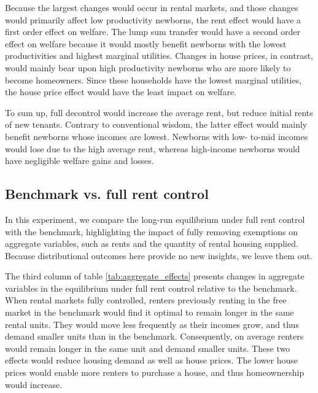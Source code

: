 \documentclass[parskip=full]{article}
\begin{document}
Because the largest changes would occur in rental markets, and those changes would primarily affect low productivity newborns, the rent effect would have a first order effect on welfare. The lump sum transfer would have a second order effect on welfare because it would mostly benefit newborns with the lowest productivities and highest marginal utilities. Changes in house prices, in contrast, would mainly bear upon high productivity newborns who are more likely to become homeowners. Since these households have the lowest marginal utilities, the house price effect would have the least impact on welfare. 

To sum up, full decontrol would increase the average rent, but reduce initial rents of new tenants. Contrary to conventional wisdom, the latter effect would mainly benefit newborns whose incomes are lowest. Newborns with low- to-mid incomes would lose due to the high average rent, whereas high-income newborns would have negligible welfare gains and losses.

\subsection{Benchmark vs. full rent control}

In this experiment, we compare the long-run equilibrium under full rent control with the benchmark, highlighting the impact of fully removing exemptions on aggregate variables, such as rents and the quantity of rental housing supplied. Because distributional outcomes here provide no new insights, we leave them out.

The third column of table \ref{tab:aggregate_effects} presents changes in aggregate variables in the equilibrium under full rent control relative to the benchmark. When rental markets fully controlled, renters previously renting in the free market in the benchmark would find it optimal to remain longer in the same rental units. They would move less frequently as their incomes grow, and thus demand smaller units than in the benchmark. Consequently, on average renters would remain longer in the same unit and demand smaller units. These two effects would reduce housing demand as well as house prices. The lower house prices would enable more renters to purchase a house, and thus homeownership would increase.
\end{document}
